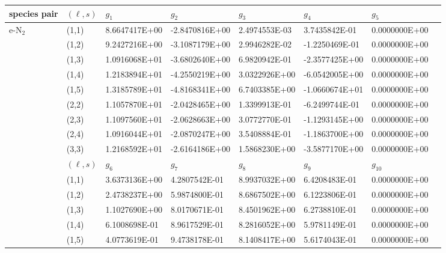 \documentclass{warpdoc}
\renewcommand{\fontsizetable}{\footnotesize\scalefont{1.0}}
\begin{document}
\begin{table}[h]
\fontsizetable
\begin{center}
  \begin{threeparttable}
    \fontsizetable
    \begin{tabular*}{\textwidth}{@{\extracolsep{\fill}}llllllll}
      \toprule
species pair & $(\ell,s)$ & $g_1$ & $g_2$ & $g_3$ & $g_4$ & $g_5$ \\
\midrule
\multirow{19}{*}{e-$\mathrm{N_2}$} &	(1,1)	&	8.6647417E+00	&	-2.8470816E+00	&	2.4974553E-03	&	3.7435842E-01	&	0.0000000E+00	\\
&	(1,2)	&	9.2427216E+00	&	-3.1087179E+00	&	2.9946282E-02	&	-1.2250469E-01	&	0.0000000E+00	\\
&	(1,3)	&	1.0916068E+01	&	-3.6802640E+00	&	6.9820942E-01	&	-2.3577425E+00	&	0.0000000E+00	\\
&	(1,4)	&	1.2183894E+01	&	-4.2550219E+00	&	3.0322926E+00	&	-6.0542005E+00	&	0.0000000E+00	\\
&	(1,5)	&	1.3185789E+01	&	-4.8168341E+00	&	6.7403385E+00	&	-1.0660674E+01	&	0.0000000E+00	\\
&	(2,2)	&	1.1057870E+01	&	-2.0428465E+00	&	1.3399913E-01	&	-6.2499744E-01	&	0.0000000E+00	\\
&	(2,3)	&	1.1097560E+01	&	-2.0628663E+00	&	3.0772770E-01	&	-1.1293145E+00	&	0.0000000E+00	\\
&	(2,4)	&	1.0916044E+01	&	-2.0870247E+00	&	3.5408884E-01	&	-1.1863700E+00	&	0.0000000E+00	\\
&	(3,3)	&	1.2168592E+01	&	-2.6164186E+00	&	1.5868230E+00	&	-3.5877170E+00	&	0.0000000E+00	\\
\cmidrule(lr{1em}){2-7}
 & $(\ell,s)$ & $g_6$ & $g_7$ & $g_8$ & $g_9$ & $g_{10}$ \\
\cmidrule(lr{1em}){2-7}
&	(1,1)	&	3.6373136E+00	&	4.2807542E-01	&	8.9937032E+00	&	6.4208483E-01	&	0.0000000E+00	\\
&	(1,2)	&	2.4738237E+00	&	5.9874800E-01	&	8.6867502E+00	&	6.1223806E-01	&	0.0000000E+00	\\
&	(1,3)	&	1.1027690E+00	&	8.0170671E-01	&	8.4501962E+00	&	6.2738810E-01	&	0.0000000E+00	\\
&	(1,4)	&	6.1008698E-01	&	8.9617529E-01	&	8.2816052E+00	&	5.9781149E-01	&	0.0000000E+00	\\
&	(1,5)	&	4.0773619E-01	&	9.4738178E-01	&	8.1408417E+00	&	5.6174043E-01	&	0.0000000E+00	\\

\end{tabular*}
\end{threeparttable}
\end{center}
\end{table}
\end{document}

